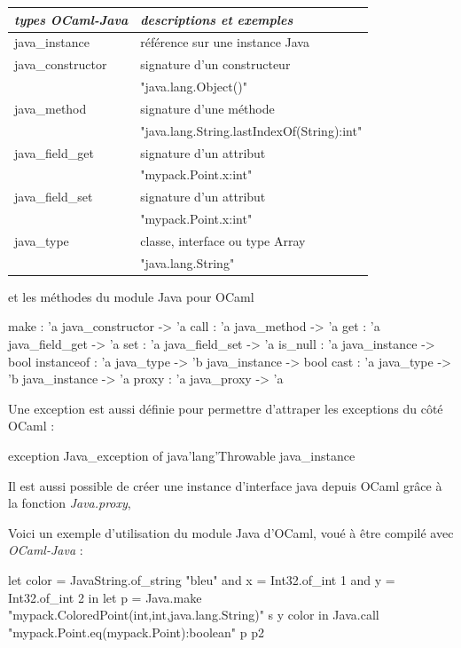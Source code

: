 \documentclass[a4paper, 11pt]{article}
\begin{document}
\begin{tabular}{|l|l|}
  \hline
  \emph{types OCaml-Java} & \emph{descriptions et exemples} \\\hline
  java\_instance & référence sur une instance Java  \\
  \hline
  java\_constructor & signature d'un constructeur  \\
  &  "java.lang.Object()" \\
  \hline
  java\_method & signature d'une méthode \\
  & "java.lang.String.lastIndexOf(String):int"\\
  \hline
  java\_field\_get & signature d'un attribut\\
  & "mypack.Point.x:int" \\
  \hline
  java\_field\_set & signature d'un attribut\\
  & "mypack.Point.x:int" \\
  \hline
  java\_type & classe, interface ou type Array\\
  & "java.lang.String"\\
  \hline
\end{tabular}

\noindent
et les méthodes du module Java\cite{module Java} pour OCaml

\begin{OCamlEx}
make : 'a java_constructor -> 'a 
call : 'a java_method -> 'a 
get : 'a java_field_get -> 'a 
set : 'a java_field_set -> 'a 
is_null : 'a java_instance -> bool 
instanceof : 'a java_type -> 'b java_instance -> bool
cast : 'a java_type -> 'b java_instance -> 'a
proxy : 'a java_proxy -> 'a
\end{OCamlEx}
Une exception est aussi définie pour permettre d'attraper les
exceptions du côté OCaml :
\begin{OCamlEx}
exception Java_exception of java'lang'Throwable java_instance
\end{OCamlEx}

Il est aussi possible de créer une instance d'interface java depuis 
OCaml grâce à la fonction \emph{Java.proxy}, 

\newpage
Voici un exemple d'utilisation du module Java \cite{module Java} d'OCaml, voué à être compilé avec \emph{OCaml-Java} :
\begin{OCamlEx}
let color = JavaString.of_string "bleu"
and x = Int32.of_int 1
and y = Int32.of_int 2 in
let p = Java.make "mypack.ColoredPoint(int,int,java.lang.String)" s y color 
in
   Java.call "mypack.Point.eq(mypack.Point):boolean" p p2
\end{OCamlEx}
\end{document}
